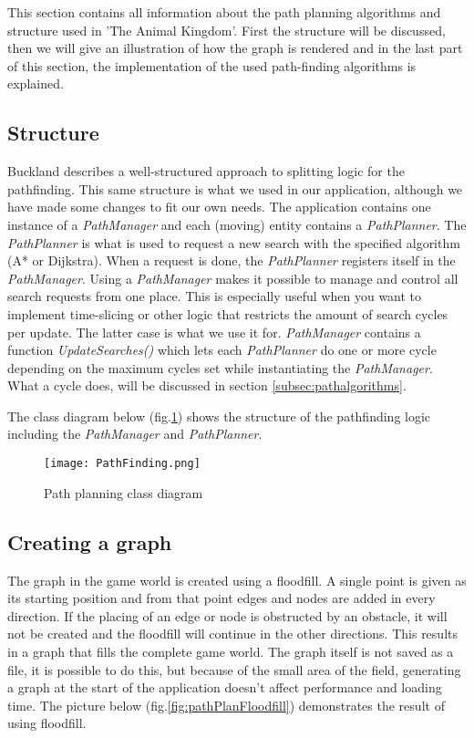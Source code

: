 This section contains all information about the path planning algorithms and structure used in 'The Animal Kingdom'.
First the structure will be discussed, then we will give an illustration of how the graph is rendered and in the last part of this section,
the implementation of the used path-finding algorithms is explained.

\subsection{Structure}\label{subsec:pathstructure}
Buckland describes\cite{pgaie} a well-structured approach to splitting logic for the pathfinding.
This same structure is what we used in our application, although we have made some changes to fit our own needs.
The application contains one instance of a \textit{PathManager} and each (moving) entity contains a \textit{PathPlanner}.
The \textit{PathPlanner} is what is used to request a new search with the specified algorithm (A* or Dijkstra).
When a request is done, the \textit{PathPlanner} registers itself in the \textit{PathManager}.
Using a \textit{PathManager} makes it possible to manage and control all search requests from one place.
This is especially useful when you want to implement time-slicing or other logic that restricts the amount of search cycles per update.
The latter case is what we use it for.
\textit{PathManager} contains a function \textit{UpdateSearches()} which lets each \textit{PathPlanner} do one or more cycle depending on the maximum cycles set while instantiating the \textit{PathManager}.
What a cycle does, will be discussed in section \ref{subsec:pathalgorithms}.\par
The class diagram below (fig.\ref{fig:pathPlanClassDiagram}) shows the structure of the pathfinding logic including the \textit{PathManager} and \textit{PathPlanner}.

\begin{figure}[h!]
    \begin{center}
        \texttt{[image: PathFinding.png]}
    \end{center}
    \caption{Path planning class diagram}
    \label{fig:pathPlanClassDiagram}
\end{figure}

\subsection{Creating a graph}\label{subsec:pathgraphcreation}
The graph in the game world is created using a floodfill.
A single point is given as its starting position and from that point edges and nodes are added in every direction.
If the placing of an edge or node is obstructed by an obstacle, it will not be created and the floodfill will continue
in the other directions.
This results in a graph that fills the complete game world.
The graph itself is not saved as a file, it is possible to do this, but because of the small area of the field,
generating a graph at the start of the application doesn't affect performance and loading time.
The picture below (fig.\ref{fig:pathPlanFloodfill}) demonstrates the result of using floodfill.

